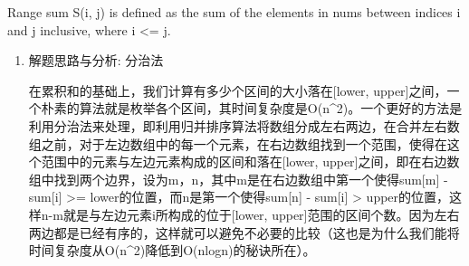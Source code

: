 \documentclass[9pt, b5paaper]{book}
\begin{document}
Range sum S(i, j) is defined as the sum of the elements in nums between indices i and j inclusive, where i <= j.
\begin{enumerate}
\item 解题思路与分析: 分治法
\label{sec-1-0-4-1}

在累积和的基础上，我们计算有多少个区间的大小落在[lower, upper]之间，一个朴素的算法就是枚举各个区间，其时间复杂度是O(n\^{}2)。一个更好的方法是利用分治法来处理，即利用归并排序算法将数组分成左右两边，在合并左右数组之前，对于左边数组中的每一个元素，在右边数组找到一个范围，使得在这个范围中的元素与左边元素构成的区间和落在[lower, upper]之间，即在右边数组中找到两个边界，设为m，n，其中m是在右边数组中第一个使得sum[m] - sum[i] >= lower的位置，而n是第一个使得sum[n] - sum[i] > upper的位置，这样n-m就是与左边元素i所构成的位于[lower, upper]范围的区间个数。因为左右两边都是已经有序的，这样就可以避免不必要的比较（这也是为什么我们能将时间复杂度从O(n\^{}2)降低到O(nlogn)的秘诀所在）。


\end{enumerate}
\end{document}
